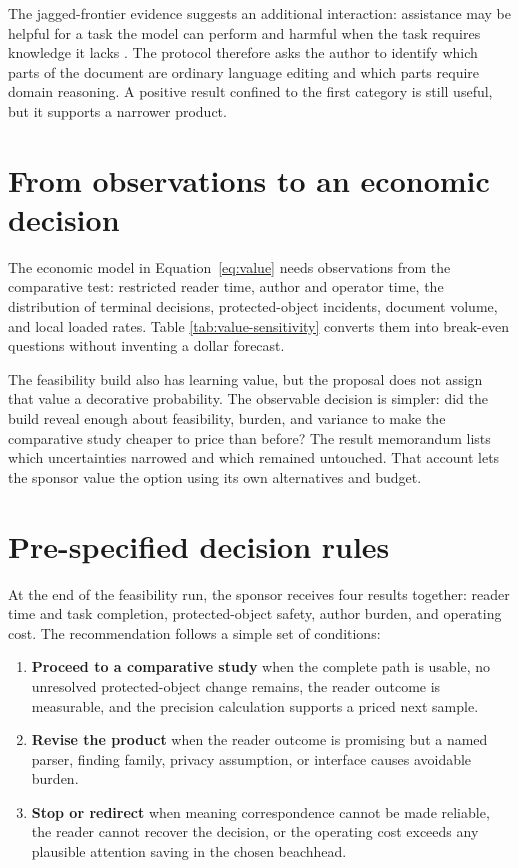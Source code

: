 The jagged-frontier evidence suggests an additional interaction: assistance
may be helpful for a task the model can perform and harmful when the task
requires knowledge it lacks \citep{dellacqua2026jagged}. The protocol therefore
asks the author to identify which parts of the document are ordinary language
editing and which parts require domain reasoning. A positive result confined
to the first category is still useful, but it supports a narrower product.

\section{From observations to an economic decision}
\label{sec:eval-economic-decision}

The economic model in Equation~\eqref{eq:value} needs observations from the
comparative test: restricted reader time, author and operator time, the
distribution of terminal decisions, protected-object incidents, document
volume, and local loaded rates. Table
\ref{tab:value-sensitivity} converts them into break-even questions without
inventing a dollar forecast.

The feasibility build also has learning value, but the proposal does not assign
that value a decorative probability. The observable decision is simpler: did
the build reveal enough about feasibility, burden, and variance to make the
comparative study cheaper to price than before? The result memorandum lists
which uncertainties narrowed and which remained untouched. That account lets
the sponsor value the option using its own alternatives and budget.

\section{Pre-specified decision rules}
\label{sec:eval-rules}

At the end of the feasibility run, the sponsor receives four results together:
reader time and task completion, protected-object safety, author burden, and
operating cost. The recommendation follows a simple set of conditions:

\begin{enumerate}
\item \textbf{Proceed to a comparative study} when the complete path is
      usable, no unresolved protected-object change remains, the reader outcome
      is measurable, and the precision calculation supports a priced next
      sample.
\item \textbf{Revise the product} when the reader outcome is promising but a
      named parser, finding family, privacy assumption, or interface causes
      avoidable burden.
\item \textbf{Stop or redirect} when meaning correspondence cannot be made
      reliable, the reader cannot recover the decision, or the operating cost
      exceeds any plausible attention saving in the chosen beachhead.
\end{enumerate}

